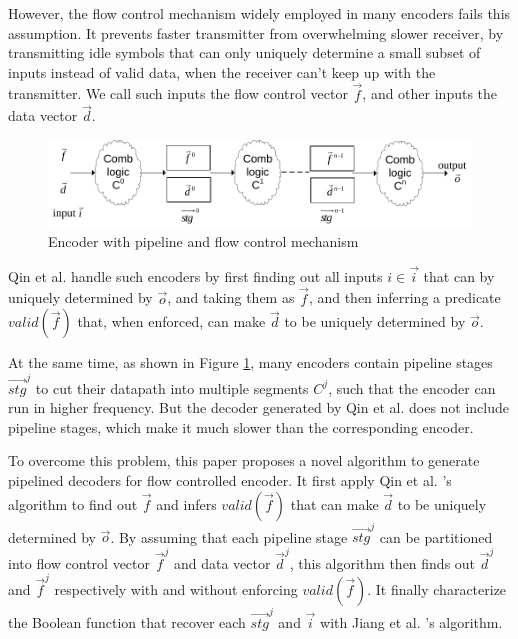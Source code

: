 \documentclass[runningheads,a4paper,orivec]{llncs}
\begin{document}
However,
the flow control mechanism \cite{flowcontrol} widely employed in many encoders
fails this assumption.
It prevents faster transmitter from overwhelming slower receiver,
by transmitting idle symbols that can only uniquely determine a small subset of inputs instead of valid data,
when the receiver can't keep up with the transmitter.
We call such inputs the flow control vector $\vec{f}$,
and other inputs the data vector $\vec{d}$.

\begin{figure}[t]
\centering
\includegraphics[width=\textwidth]{pipemod1}
\caption{Encoder with pipeline and flow control mechanism}
\label{pipemod}
\end{figure}

Qin et al. \cite{QinTODAES15} handle such encoders by
first finding out all inputs $i\in\vec{i}$ that can by uniquely determined by $\vec{o}$,
and taking them as $\vec{f}$,
and then inferring a predicate $valid(\vec{f})$ that,
when enforced,
can make $\vec{d}$ to be uniquely determined by $\vec{o}$.

At the same time,
as shown in Figure \ref{pipemod},
many encoders contain
pipeline stages $\vec{stg}^j$ to cut their datapath into multiple segments $C^j$,
such that the encoder can run in higher frequency.
But the decoder generated by Qin et al. \cite{QinTODAES15} does not include pipeline stages,
which make it much slower than the corresponding encoder.

To overcome this problem,
this paper proposes a novel algorithm to generate pipelined decoders for flow controlled encoder.
It first apply Qin et al. \cite{QinTODAES15}'s algorithm to find out $\vec{f}$ and infers $valid(\vec{f})$ that can make $\vec{d}$ to be uniquely 
determined by $\vec{o}$.
By assuming that each pipeline stage $\vec{stg}^j$ can be partitioned into flow control vector $\vec{f}^j$ and data vector $\vec{d}^j$,
this algorithm then finds out $\vec{d}^j$ and $\vec{f}^j$ respectively with and without enforcing $valid(\vec{f})$.
It finally characterize the Boolean function that recover each $\vec{stg}^j$ and $\vec{i}$ with 
Jiang et al. \cite{InterpBoolFunction}'s algorithm.
\end{document}
